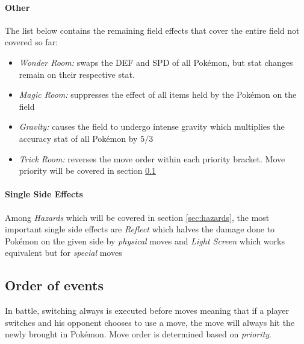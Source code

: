 \paragraph{Other}
The list below contains the remaining field effects that cover the entire field not covered so far:
\begin{itemize}
	\item \textit{Wonder Room:} swaps the \ac{DEF} and \ac{SPD} of all Pokémon, but stat changes
	remain on their respective stat. 
	\item \textit{Magic Room:} suppresses the effect of all items held by the Pokémon on the field
	\item \textit{Gravity:} causes the field to undergo intense gravity which multiplies the accuracy stat of
	all Pokémon by $5/3$ 
	\item \textit{Trick Room:} reverses the move order within each priority bracket. Move priority will be covered
	in section \ref{sec:order-of-events}
\end{itemize}

\paragraph{Single Side Effects}
Among \textit{Hazards} which will be covered in section \ref{sec:hazards}, the most important single side
effects are \textit{Reflect} which halves the damage done to Pokémon on the given side by \textit{physical}
moves  and \textit{Light Screen} which works
equivalent but for \textit{special} moves 

\subsection{Order of events}
\label{sec:order-of-events}
In battle, switching always is executed before moves meaning that if a player switches and his opponent chooses
to use a move, the move will always hit the newly brought in Pokémon. Move order is determined based on
\textit{priority}.
